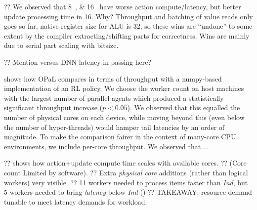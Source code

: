 \documentclass[sigconf,natbib=false]{acmart}
\newcommand{\approachshort}{OPaL}
\newcommand{\Indfw}{\emph{Ind}}
\begin{document}
?? We observed that \SIlist{8;16}{\bit} have worse action compute/latency, but better update processing time in \SI{16}{\bit}. Why? Throughput and batching of value reads only goes so far, native register size for ALU is \SI{32}{\bit}, so these wins are ``undone'' to some extent by the compiler extracting/shifting parts  for correctness. Wins are mainly due to serial part scaling with bitsize.

?? Mention versus DNN latency in passing here?

\begin{table}
	\caption{Latencies and computation times for \approachshort{} versus commodity hardware hosts. On-device execution is crucial in not only lowering latencies, but in reducing tail latencies. Lower is better, with the best marked \emph{in bold}.\label{tab:lats}}
\end{table}

\begin{table}
	\caption{Action and update throughputs for \approachshort{} versus commodity hardware hosts. Most designs cannot scale online performance with additional cores. Higher is better, with the best marked \emph{in bold}.\label{tab:tputs}}
\end{table}

 shows how \approachshort{} compares in terms of throughput with a numpy-based implementation of an RL policy.
We choose the worker count on host machines with the largest number of parallel agents which produced a statistically significant throughput increase ($p < 0.05$).
We observed that this equalled the number of physical cores on each device, while moving beyond this (even below the number of hyper-threads) would hamper tail latencies by an order of magnitude.
To make the comparison fairer in the context of many-core CPU environments, we include per-core throughput.
We observed that ...

??  shows how action+update compute time scales with available cores.
?? (Core count Limited by software).
?? Extra \emph{physical core} additions (rather than logical workers) very visible.
?? 11 workers needed to process items faster than \Indfw{}, but 5 workers needed to bring \emph{latency} below \Indfw{} ()
?? TAKEAWAY: resource demand tunable to meet latency demands for workload.
\end{document}
